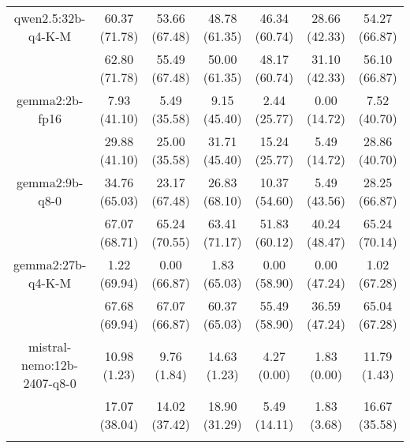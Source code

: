 \begin{table}[]
{\begin{tabular}{ccccccc}
        \multicolumn{1}{c|}{qwen2.5:32b-q4-K-M} & 60.37 (71.78) & 53.66 (67.48) & \multicolumn{1}{c|}{48.78 (61.35)} & 46.34 (60.74) & \multicolumn{1}{c|}{28.66 (42.33)} & 54.27 (66.87) \\
        
        

        \multicolumn{1}{c|}{} & 62.80 (71.78) & 55.49 (67.48) & \multicolumn{1}{c|}{50.00 (61.35)} & 48.17 (60.74) & \multicolumn{1}{c|}{31.10 (42.33)} & 56.10 (66.87) \\
        \cline{1-7}
        

        \multicolumn{1}{c|}{gemma2:2b-fp16} & 7.93 (41.10) & 5.49 (35.58) & \multicolumn{1}{c|}{9.15 (45.40)} & 2.44 (25.77) & \multicolumn{1}{c|}{0.00 (14.72)} & 7.52 (40.70) \\
        
        

        \multicolumn{1}{c|}{} & 29.88 (41.10) & 25.00 (35.58) & \multicolumn{1}{c|}{31.71 (45.40)} & 15.24 (25.77) & \multicolumn{1}{c|}{5.49 (14.72)} & 28.86 (40.70) \\
        \cline{1-7}
        

        \multicolumn{1}{c|}{gemma2:9b-q8-0} & 34.76 (65.03) & 23.17 (67.48) & \multicolumn{1}{c|}{26.83 (68.10)} & 10.37 (54.60) & \multicolumn{1}{c|}{5.49 (43.56)} & 28.25 (66.87) \\
        
        

        \multicolumn{1}{c|}{} & 67.07 (68.71) & 65.24 (70.55) & \multicolumn{1}{c|}{63.41 (71.17)} & 51.83 (60.12) & \multicolumn{1}{c|}{40.24 (48.47)} & 65.24 (70.14) \\
        \cline{1-7}
        

        \multicolumn{1}{c|}{gemma2:27b-q4-K-M} & 1.22 (69.94) & 0.00 (66.87) & \multicolumn{1}{c|}{1.83 (65.03)} & 0.00 (58.90) & \multicolumn{1}{c|}{0.00 (47.24)} & 1.02 (67.28) \\
        
        

        \multicolumn{1}{c|}{} & 67.68 (69.94) & 67.07 (66.87) & \multicolumn{1}{c|}{60.37 (65.03)} & 55.49 (58.90) & \multicolumn{1}{c|}{36.59 (47.24)} & 65.04 (67.28) \\
        \cline{1-7}
        

        \multicolumn{1}{c|}{mistral-nemo:12b-2407-q8-0} & 10.98 (1.23) & 9.76 (1.84) & \multicolumn{1}{c|}{14.63 (1.23)} & 4.27 (0.00) & \multicolumn{1}{c|}{1.83 (0.00)} & 11.79 (1.43) \\
        
        

        \multicolumn{1}{c|}{} & 17.07 (38.04) & 14.02 (37.42) & \multicolumn{1}{c|}{18.90 (31.29)} & 5.49 (14.11) & \multicolumn{1}{c|}{1.83 (3.68)} & 16.67 (35.58) \\
        \cline{1-7}
        
\\ \hline
\end{tabular}%
}
\end{table}
    